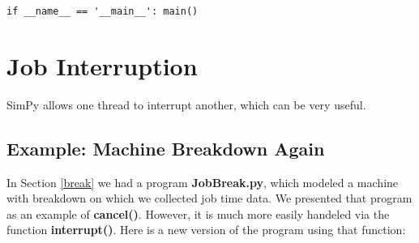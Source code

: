 \documentclass[11pt]{article}
\begin{document}
\begin{Verbatim}[fontsize=\relsize{-2}]
if __name__ == '__main__': main()
\end{Verbatim}

\section{Job Interruption}
\label{interrupt}

SimPy allows one thread to interrupt another, which can be very useful.

\subsection{Example:  Machine Breakdown Again}

In Section \ref{break} we had a program {\bf JobBreak.py}, which modeled
a machine with breakdown on which we collected job time data.  We
presented that program as an example of {\bf cancel()}.  However, it is
much more easily handeled via the function {\bf interrupt()}.  Here is a
new version of the program using that function:
\end{document}
